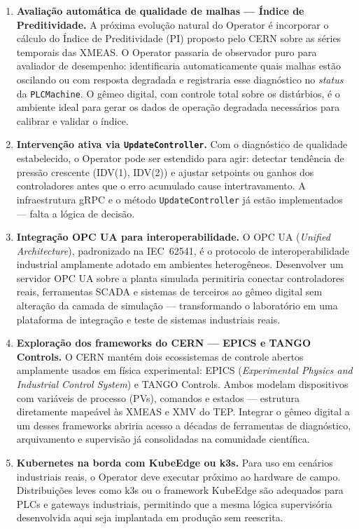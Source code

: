 \begin{enumerate}

  \item \textbf{Avaliação automática de qualidade de malhas — Índice de Preditividade.}
  A próxima evolução natural do Operator é incorporar o cálculo do Índice de Preditividade (PI) proposto pelo CERN \cite{CERN_WEAPL02} sobre as séries temporais das XMEAS. O Operator passaria de observador puro para avaliador de desempenho: identificaria automaticamente quais malhas estão oscilando ou com resposta degradada e registraria esse diagnóstico no \textit{status} da \texttt{PLCMachine}. O gêmeo digital, com controle total sobre os distúrbios, é o ambiente ideal para gerar os dados de operação degradada necessários para calibrar e validar o índice.

  \item \textbf{Intervenção ativa via \texttt{UpdateController}.}
  Com o diagnóstico de qualidade estabelecido, o Operator pode ser estendido para agir: detectar tendência de pressão crescente (IDV(1), IDV(2)) e ajustar setpoints ou ganhos dos controladores antes que o erro acumulado cause intertravamento. A infra\-estrutura gRPC e o método \texttt{UpdateController} já estão implementados — falta a lógica de decisão.

  \item \textbf{Integração OPC UA para interoperabilidade.}
  O OPC UA (\textit{Unified Architecture}), padronizado na IEC~62541, é o protocolo de interoperabilidade industrial amplamente adotado em ambientes heterogêneos. Desenvolver um servidor OPC UA sobre a planta simulada permitiria conectar controladores reais, ferramentas SCADA e sistemas de terceiros ao gêmeo digital sem alteração da camada de simulação — transformando o laboratório em uma plataforma de integração e teste de sistemas industriais reais.

  \item \textbf{Exploração dos frameworks do CERN — EPICS e TANGO Controls.}
  O CERN mantém dois ecossistemas de controle abertos amplamente usados em física experimental: EPICS (\textit{Experimental Physics and Industrial Control System}) e TANGO Controls. Ambos modelam dispositivos com variáveis de processo (PVs), comandos e estados — estrutura diretamente mapeável às XMEAS e XMV do TEP. Integrar o gêmeo digital a um desses frameworks abriria acesso a décadas de ferramentas de diagnóstico, arquivamento e supervisão já consolidadas na comunidade científica.

  \item \textbf{Kubernetes na borda com KubeEdge ou k3s.}
  Para uso em cenários industriais reais, o Operator deve executar próximo ao hardware de campo. Distribuições leves como k3s ou o framework KubeEdge \cite{KUBEEDGE2023} são adequados para PLCs e gateways industriais, permitindo que a mesma lógica supervisória desenvolvida aqui seja implantada em produção sem reescrita.


\end{enumerate}
